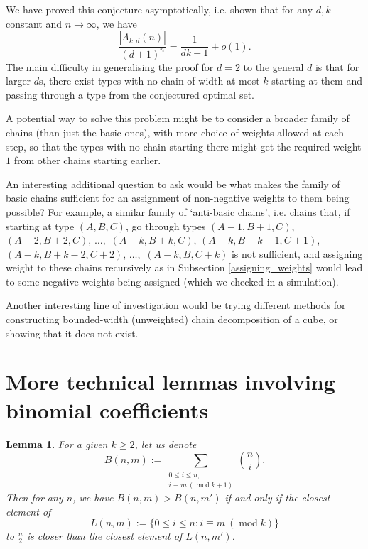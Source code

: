 \documentclass[11pt, reqno]{amsart}
\newtheorem{lemma}[theorem]{Lemma}
\numberwithin{equation}{section}
\newcommand\modd{\operatorname{mod}}
\begin{document}
We have proved this conjecture asymptotically, i.e. shown that for any $d, k$ constant and $n \rightarrow \infty$, we have
\begin{equation}
    \frac{|A_{k,d}(n)|}{(d+1)^n} = \frac{1}{dk+1} + o(1).
\end{equation}
The main difficulty in generalising the proof for $d=2$ to the general $d$ is that for larger $d$s, there exist types with no chain of width at most $k$ starting at them and passing through a type from the conjectured optimal set.

A potential way to solve this problem might be to consider a broader family of chains (than just the basic ones), with more choice of weights allowed at each step, so that the types with no chain starting there might get the required weight $1$ from other chains starting earlier.

An interesting additional question to ask would be what makes the family of basic chains sufficient for an assignment of non-negative weights to them being possible? For example, a similar family of `anti-basic chains', i.e. chains that, if starting at type $(A, B, C)$, go through types $(A-1, B+1, C)$, $(A-2, B+2, C)$, $\dots,$ $(A-k, B+k, C)$, $(A-k, B+k-1, C+1)$, $(A-k, B+k-2, C+2)$, $\dots,$ $(A-k, B, C+k)$ is not sufficient, and assigning weight to these chains recursively as in Subsection \ref{assigning_weights} would lead to some negative weights being assigned (which we checked in a simulation).

Another interesting line of investigation would be trying different methods for constructing bounded-width (unweighted) chain decomposition of a cube, or showing that it does not exist.

\appendix

\section{More technical lemmas involving binomial coefficients}
\label{appendix_proofs}

\begin{lemma}
\label{layers_modulo_largest}
    For a given $k \geqslant 2$, let us denote
    \begin{equation*}
        B(n, m) := \sum_{\substack{0 \leqslant i \leqslant n, \\ i \equiv m \ (\modd k+1)}} \binom{n}{i}.
    \end{equation*}
    Then for any $n$, we have $B(n, m)>B(n, m')$ if and only if the closest element of
    \begin{equation*}
        L(n, m) := \{0 \leqslant i \leqslant n: i \equiv m \ (\modd k)\}
    \end{equation*}
    to $\frac{n}{2}$ is closer than the closest element of $L(n, m')$.
\end{lemma}
\end{document}
